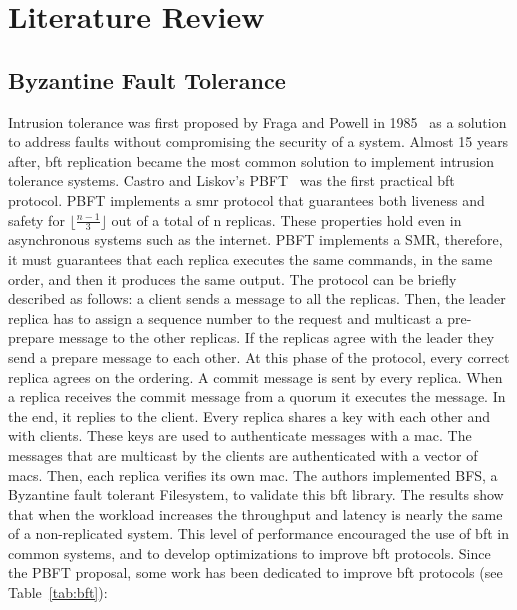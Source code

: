 \chapter{Literature Review}
\label{chap:literaturereview}

\section{Byzantine Fault Tolerance}
\label{sec:bft}

Intrusion tolerance was first proposed by Fraga and Powell in 1985~\cite{Fraga:1985} as a solution to address faults without compromising the security of a system. 
Almost 15 years after, \gls{bft} replication became the most common solution to implement intrusion tolerance systems.
Castro and Liskov’s PBFT~\cite{Castro:1999} was the first practical \gls{bft} protocol. 
PBFT implements a \gls{smr} protocol that guarantees both liveness and safety for $\lfloor\frac{n-1}{3}\rfloor$ out of a total of n replicas. 
These properties hold even in asynchronous systems such as the internet. 
PBFT implements a SMR, therefore, it must guarantees that each replica executes the same commands, in the same order, and then it produces the same output. 
The protocol can be briefly described as follows: a client sends a message to all the replicas.
Then, the leader replica has to assign a sequence number to the request and multicast a pre-prepare message to the other replicas. 
If the replicas agree with the leader they send a prepare message to each other. 
At this phase of the protocol, every correct replica agrees on the ordering. 
A commit message is sent by every replica. When a replica receives the commit message from a quorum it executes the message. 
In the end, it replies to the client. 
Every replica shares a key with each other and with clients. These keys are used to authenticate messages with a \gls{mac}. 
The messages that are multicast by the clients are authenticated with a vector of \glspl{mac}. 
Then, each replica verifies its own \gls{mac}.
The authors implemented BFS, a Byzantine fault tolerant Filesystem, to validate this \gls{bft} library. 
The results show that when the workload increases the throughput and latency is nearly the same of a non-replicated system. 
This level of performance encouraged the use of \gls{bft} in common systems, and to develop optimizations to improve \gls{bft} protocols. 
Since the PBFT proposal, some work has been dedicated to improve \gls{bft} protocols (see Table~\ref{tab:bft}):


